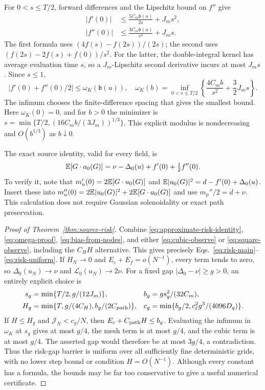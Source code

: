 For $0<s\le T/2$, forward differences and the Lipschitz bound on $f''$
give
\begin{align}
 |f'(0)|&\le\frac{5C_m\mathfrak b(u)}{2s}+J_ms^2,\\
 |f''(0)|&\le\frac{3C_m\mathfrak b(u)}{s^2}+J_ms.
 \label{eq:jet-estimates}
\end{align}
The first formula uses $(4f(s)-f(2s))/(2s)$; the second uses
$(f(2s)-2f(s)+f(0))/s^2$.
For the latter, the double-integral kernel has average evaluation time
$s$, so a $J_m$-Lipschitz second derivative incurs at most $J_ms$.
Since $s\le1$,
\begin{equation}
 |f'(0)+f''(0)/2|\le\omega_K(\mathfrak b(u)),\quad
 \omega_K(b)=\inf_{0<s\le T/2}\left\{\frac{4C_mb}{s^2}+\frac32J_ms\right\}.
 \label{eq:omega-proof}
\end{equation}
The infimum chooses the finite-difference spacing that gives the smallest
bound. Here $\omega_K(0)=0$, and for $b>0$ the minimizer is
$s=\min\{T/2,(16C_mb/(3J_m))^{1/3}\}$. This explicit modulus is
nondecreasing and $O(b^{1/3})$ as $b\downarrow0$.

The exact source identity, valid for every field, is
\begin{equation}
 \mathbb E[G\cdot a_0(G)]
 =\nu-\Delta_0(u)+f'(0)+\tfrac12f''(0).
 \label{eq:approximate-risk-identity}
\end{equation}
To verify it, note that
$m_u'(0)=2\mathbb E[G\cdot u_0(G)]$ and
$\mathbb E|u_0(G)|^2=d-f'(0)+\Delta_0(u)$.
Insert these into
$m_u''(0)=2\mathbb E|u_0(G)|^2+2\mathbb E[G\cdot a_0(G)]$ and use
$m_p''/2=d+\nu$. This calculation does not require Gaussian
solenoidality or exact path preservation.

\begin{proof}[Proof of Theorem~\ref{thm:source-risk}]
Combine \eqref{eq:approximate-risk-identity}, \eqref{eq:omega-proof},
\eqref{eq:bias-from-nodes}, and either \eqref{eq:cubic-observe} or
\eqref{eq:square-observe}, including the $C_HH$ alternative.
This gives precisely Eqs.~\eqref{eq:risk-main}--\eqref{eq:risk-uniform}.
If $H_N\to0$ and $E_c+E_f=o(N^{-1})$, every term tends to zero,
so $\Delta_0(u_N)\to\nu$ and $\mathcal L_0(u_N)\to2\nu$.
For a fixed gap $|\Delta_0-\nu|\ge g>0$, an entirely explicit choice is
\begin{align}
 s_g&=\min\{T/2,g/(12J_m)\}, & b_g&=g s_g^2/(32C_m),\\
 H_g&=\min\{T,g/(4C_H),b_g/(2C_{\rm path})\}, &
 c_g&=\min\{b_g/2,c_\ell^2g^3/(4096D_q)\}.
 \label{eq:explicit-gap-barrier}
\end{align}
If $H\le H_g$ and $\mathcal J_N<c_g/N$, then
$E_c+C_{\rm path}H\le b_g$. Evaluating the infimum in $\omega_K$
at $s_g$ gives at most $g/4$, the mesh term is at most $g/4$, and
the cubic term is at most $g/4$. The asserted gap would therefore be
at most $3g/4$, a contradiction. Thus the risk-gap barrier is uniform
over all sufficiently fine deterministic grids, with no lower step
bound or condition $H=O(N^{-1})$.
Although every constant has a formula, the bounds may be far too
conservative to give a useful numerical certificate.
\end{proof}

